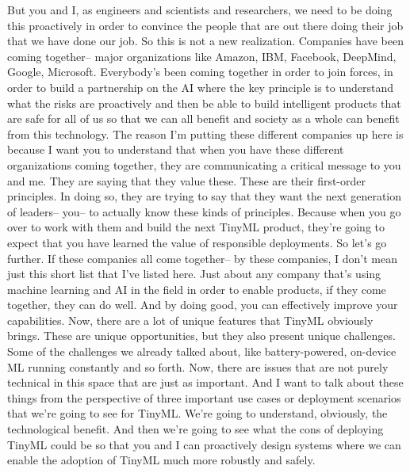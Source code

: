 But you and I, as engineers and scientists and researchers, we need to be doing this proactively in order to convince the people that are out there doing their job that we have done our job.
So this is not a new realization.
Companies have been coming together-- major organizations like Amazon, IBM, Facebook, DeepMind, Google, Microsoft.
Everybody's been coming together in order to join forces, in order to build a partnership on the AI where the key principle is to understand what the risks are proactively and then be able to build intelligent products that are safe for all of us so that we can all benefit and society as a whole can benefit from this technology.
The reason I'm putting these different companies up here is because I want you to understand that when you have these different organizations coming together, they are communicating a critical message to you and me.
They are saying that they value these.
These are their first-order principles.
In doing so, they are trying to say that they want the next generation of leaders-- you-- to actually know these kinds of principles.
Because when you go over to work with them and build the next TinyML product, they're going to expect that you have learned the value of responsible deployments.
So let's go further.
If these companies all come together-- by these companies, I don't mean just this short list that I've listed here.
Just about any company that's using machine learning and AI in the field in order to enable products, if they come together, they can do well.
And by doing good, you can effectively improve your capabilities.
Now, there are a lot of unique features that TinyML obviously brings.
These are unique opportunities, but they also present unique challenges.
Some of the challenges we already talked about, like battery-powered, on-device ML running constantly and so forth.
Now, there are issues that are not purely technical in this space that are just as important.
And I want to talk about these things from the perspective of three important use cases or deployment scenarios that we're going to see for TinyML.
We're going to understand, obviously, the technological benefit.
And then we're going to see what the cons of deploying TinyML could be so that you and I can proactively design systems where we can enable the adoption of TinyML much more robustly and safely.




